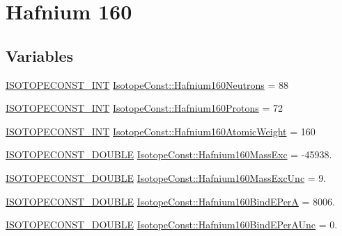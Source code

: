 \hypertarget{group___isotope_const-_hafnium-_hf160}{}\section{Hafnium 160}
\label{group___isotope_const-_hafnium-_hf160}
\subsection*{Variables}
\begin{DoxyCompactItemize}
\item 
\mbox{\hyperlink{group___isotope_const-_macros_ga5f18360b3e99483a35c32d789e62621c}{I\+S\+O\+T\+O\+P\+E\+C\+O\+N\+S\+T\+\_\+\+I\+NT}} \mbox{\hyperlink{group___isotope_const-_hafnium-_hf160_gaf99fdc6fff8b787bc4f9b12d994094ee}{Isotope\+Const\+::\+Hafnium160\+Neutrons}} = 88
\item 
\mbox{\hyperlink{group___isotope_const-_macros_ga5f18360b3e99483a35c32d789e62621c}{I\+S\+O\+T\+O\+P\+E\+C\+O\+N\+S\+T\+\_\+\+I\+NT}} \mbox{\hyperlink{group___isotope_const-_hafnium-_hf160_ga3a0389ca24ec4b2175a2037ee8596ed9}{Isotope\+Const\+::\+Hafnium160\+Protons}} = 72
\item 
\mbox{\hyperlink{group___isotope_const-_macros_ga5f18360b3e99483a35c32d789e62621c}{I\+S\+O\+T\+O\+P\+E\+C\+O\+N\+S\+T\+\_\+\+I\+NT}} \mbox{\hyperlink{group___isotope_const-_hafnium-_hf160_gaa30ea89c0e0702326d67f6d4d49fdc7a}{Isotope\+Const\+::\+Hafnium160\+Atomic\+Weight}} = 160
\item 
\mbox{\hyperlink{group___isotope_const-_macros_ga8f45a7272ce02c0b4c65c44636ed719a}{I\+S\+O\+T\+O\+P\+E\+C\+O\+N\+S\+T\+\_\+\+D\+O\+U\+B\+LE}} \mbox{\hyperlink{group___isotope_const-_hafnium-_hf160_ga90bb89f48fc66e9d5ac3035548c30459}{Isotope\+Const\+::\+Hafnium160\+Mass\+Exc}} = -\/45938.
\item 
\mbox{\hyperlink{group___isotope_const-_macros_ga8f45a7272ce02c0b4c65c44636ed719a}{I\+S\+O\+T\+O\+P\+E\+C\+O\+N\+S\+T\+\_\+\+D\+O\+U\+B\+LE}} \mbox{\hyperlink{group___isotope_const-_hafnium-_hf160_ga50e5a0589cf52b36af35de37b87ebcdf}{Isotope\+Const\+::\+Hafnium160\+Mass\+Exc\+Unc}} = 9.
\item 
\mbox{\hyperlink{group___isotope_const-_macros_ga8f45a7272ce02c0b4c65c44636ed719a}{I\+S\+O\+T\+O\+P\+E\+C\+O\+N\+S\+T\+\_\+\+D\+O\+U\+B\+LE}} \mbox{\hyperlink{group___isotope_const-_hafnium-_hf160_ga668340f5ff3a6a2ded97cff1041f5a24}{Isotope\+Const\+::\+Hafnium160\+Bind\+E\+PerA}} = 8006.
\item 
\mbox{\hyperlink{group___isotope_const-_macros_ga8f45a7272ce02c0b4c65c44636ed719a}{I\+S\+O\+T\+O\+P\+E\+C\+O\+N\+S\+T\+\_\+\+D\+O\+U\+B\+LE}} \mbox{\hyperlink{group___isotope_const-_hafnium-_hf160_ga02cbbff1289c23af7a1b92a6d5a8c42d}{Isotope\+Const\+::\+Hafnium160\+Bind\+E\+Per\+A\+Unc}} = 0.

\end{DoxyCompactItemize}
